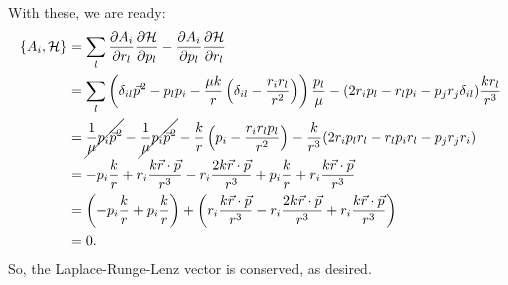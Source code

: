 \documentclass{article}
\theoremstyle{definition}
\newcommand{\p}{\partial}
\newcommand{\ham}{\mathcal{H}}
\newcommand{\f}[2]{\frac{#1}{#2}}
\newcommand{\lp}{\left(}
\newcommand{\rp}{\right)}
\begin{document}
\begin{enumerate}[label=(\alph*)]
	With these, we are ready:
	\begin{align*}
	\{ A_i , \ham \} &= \sum_l \f{\p A_i}{\p r_l}\f{\p \ham}{\p p_l} - \f{\p A_i}{\p p_l}\f{\p \ham}{\p r_l} \\
	&= \sum_l   \lp \delta_{il} \vec{p}^2 - p_l p_i - \f{\mu k}{r} \lp \delta_{il} - \f{r_ir_l}{r^2} \rp  \rp \f{p_l}{\mu} - (2 r_i p_l - r_lp_i - p_j r_j \delta_{il})\f{kr_l}{r^3} \\
	&= \cancel{\f{1}{\mu}p_i \vec{p}^2}  -\cancel{\f{1}{\mu} p_i \vec{p}^2} - \f{k }{r}\lp p_i - \f{r_i r_l p_l}{r^2}  \rp  
	- \f{k}{r^3}(2r_ip_lr_l - r_l p_i r_l - p_jr_j r_i)\\
	&= -p_i\f{k}{r} + r_i\f{k\vec{r}\cdot \vec{p}}{r^3} - r_i\f{2k \vec{r}\cdot \vec{p}}{r^3} + p_i \f{k}{r} + r_i\f{k \vec{r}\cdot \vec{p}}{r^3} \\
	&= \lp -p_i\f{k}{r} + p_i \f{k}{r} \rp + \lp r_i\f{k\vec{r}\cdot \vec{p}}{r^3} - r_i\f{2k \vec{r}\cdot \vec{p}}{r^3} +  r_i\f{k \vec{r}\cdot \vec{p}}{r^3} \rp \\
	&= 0.
	\end{align*}
	So, the Laplace-Runge-Lenz vector is conserved, as desired. 
	
	
	

\end{enumerate}
\end{document}
